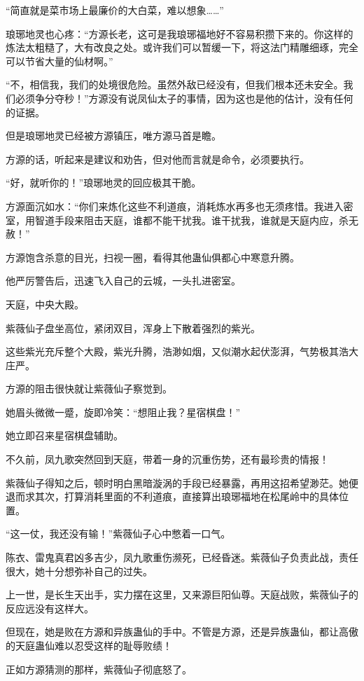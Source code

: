 \begin{this_body}
“简直就是菜市场上最廉价的大白菜，难以想象……”

琅琊地灵也心疼：“方源长老，这可是我琅琊福地好不容易积攒下来的。你这样的炼法太粗糙了，大有改良之处。或许我们可以暂缓一下，将这法门精雕细琢，完全可以节省大量的仙材啊。”

“不，相信我，我们的处境很危险。虽然外敌已经没有，但我们根本还未安全。我们必须争分夺秒！”方源没有说凤仙太子的事情，因为这也是他的估计，没有任何的证据。

但是琅琊地灵已经被方源镇压，唯方源马首是瞻。

方源的话，听起来是建议和劝告，但对他而言就是命令，必须要执行。

“好，就听你的！”琅琊地灵的回应极其干脆。

方源面沉如水：“你们来炼化这些不利道痕，消耗炼水再多也无须疼惜。我进入密室，用智道手段来阻击天庭，谁都不能干扰我。谁干扰我，谁就是天庭内应，杀无赦！”

方源饱含杀意的目光，扫视一圈，看得其他蛊仙俱都心中寒意升腾。

他严厉警告后，迅速飞入自己的云城，一头扎进密室。

天庭，中央大殿。

紫薇仙子盘坐高位，紧闭双目，浑身上下散着强烈的紫光。

这些紫光充斥整个大殿，紫光升腾，浩渺如烟，又似潮水起伏澎湃，气势极其浩大庄严。

方源的阻击很快就让紫薇仙子察觉到。

她眉头微微一蹙，旋即冷笑：“想阻止我？星宿棋盘！”

她立即召来星宿棋盘辅助。

不久前，凤九歌突然回到天庭，带着一身的沉重伤势，还有最珍贵的情报！

紫薇仙子得知之后，顿时明白黑暗漩涡的手段已经暴露，再用这招希望渺茫。她便退而求其次，打算消耗里面的不利道痕，直接算出琅琊福地在松尾岭中的具体位置。

“这一仗，我还没有输！”紫薇仙子心中憋着一口气。

陈衣、雷鬼真君凶多吉少，凤九歌重伤濒死，已经昏迷。紫薇仙子负责此战，责任很大，她十分想弥补自己的过失。

上一世，是长生天出手，实力摆在这里，又来源巨阳仙尊。天庭战败，紫薇仙子的反应远没有这样大。

但现在，她是败在方源和异族蛊仙的手中。不管是方源，还是异族蛊仙，都让高傲的天庭蛊仙难以忍受这样的耻辱败绩！

正如方源猜测的那样，紫薇仙子彻底怒了。


\end{this_body}
